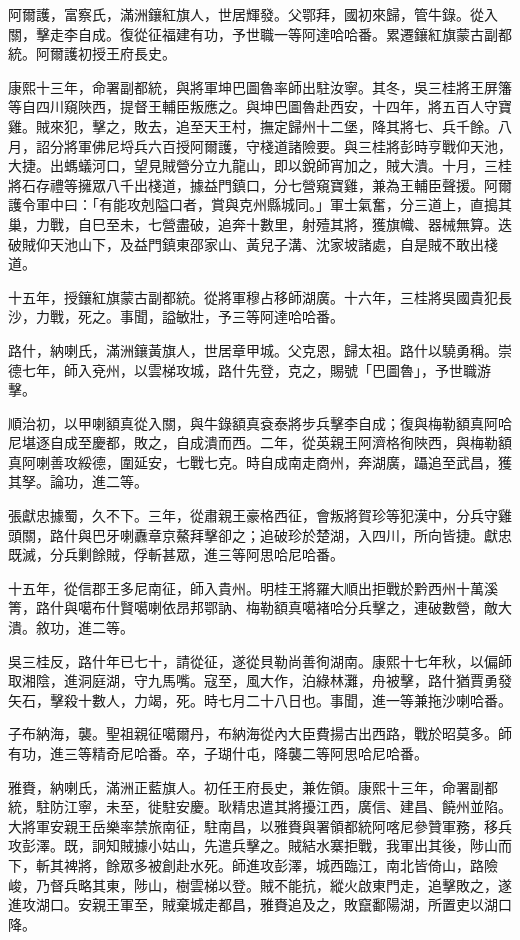 \begin{pinyinscope}
阿爾護，富察氏，滿洲鑲紅旗人，世居輝發。父鄂拜，國初來歸，管牛錄。從入關，擊走李自成。復從征福建有功，予世職一等阿達哈哈番。累遷鑲紅旗蒙古副都統。阿爾護初授王府長史。

康熙十三年，命署副都統，與將軍坤巴圖魯率師出駐汝寧。其冬，吳三桂將王屏籓等自四川窺陜西，提督王輔臣叛應之。與坤巴圖魯赴西安，十四年，將五百人守寶雞。賊來犯，擊之，敗去，追至天王村，撫定歸州十二堡，降其將七、兵千餘。八月，詔分將軍佛尼埒兵六百授阿爾護，守棧道諸險要。與三桂將彭時亨戰仰天池，大捷。出螞蟻河口，望見賊營分立九龍山，即以銳師宵加之，賊大潰。十月，三桂將石存禮等擁眾八千出棧道，據益門鎮口，分七營窺寶雞，兼為王輔臣聲援。阿爾護令軍中曰：「有能攻剋隘口者，賞與克州縣城同。」軍士氣奮，分三道上，直搗其巢，力戰，自巳至未，七營盡破，追奔十數里，射殪其將，獲旗幟、器械無算。迭破賊仰天池山下，及益門鎮東邵家山、黃兒子溝、沈家坡諸處，自是賊不敢出棧道。

十五年，授鑲紅旗蒙古副都統。從將軍穆占移師湖廣。十六年，三桂將吳國貴犯長沙，力戰，死之。事聞，謚敏壯，予三等阿達哈哈番。

路什，納喇氏，滿洲鑲黃旗人，世居章甲城。父克恩，歸太祖。路什以驍勇稱。崇德七年，師入兗州，以雲梯攻城，路什先登，克之，賜號「巴圖魯」，予世職游擊。

順治初，以甲喇額真從入關，與牛錄額真袞泰將步兵擊李自成；復與梅勒額真阿哈尼堪逐自成至慶都，敗之，自成潰而西。二年，從英親王阿濟格徇陜西，與梅勒額真阿喇善攻綏德，圍延安，七戰七克。時自成南走商州，奔湖廣，躡追至武昌，獲其孥。論功，進二等。

張獻忠據蜀，久不下。三年，從肅親王豪格西征，會叛將賀珍等犯漢中，分兵守雞頭關，路什與巴牙喇纛章京鰲拜擊卻之；追破珍於楚湖，入四川，所向皆捷。獻忠既滅，分兵剿餘賊，俘斬甚眾，進三等阿思哈尼哈番。

十五年，從信郡王多尼南征，師入貴州。明桂王將羅大順出拒戰於黔西州十萬溪箐，路什與噶布什賢噶喇依昂邦鄂訥、梅勒額真噶褚哈分兵擊之，連破數營，敵大潰。敘功，進二等。

吳三桂反，路什年已七十，請從征，遂從貝勒尚善徇湖南。康熙十七年秋，以偏師取湘陰，進洞庭湖，守九馬嘴。寇至，風大作，泊綠林灘，舟被擊，路什猶賈勇發矢石，擊殺十數人，力竭，死。時七月二十八日也。事聞，進一等兼拖沙喇哈番。

子布納海，襲。聖祖親征噶爾丹，布納海從內大臣費揚古出西路，戰於昭莫多。師有功，進三等精奇尼哈番。卒，子瑚什屯，降襲二等阿思哈尼哈番。

雅賚，納喇氏，滿洲正藍旗人。初任王府長史，兼佐領。康熙十三年，命署副都統，駐防江寧，未至，徙駐安慶。耿精忠遣其將擾江西，廣信、建昌、饒州並陷。大將軍安親王岳樂率禁旅南征，駐南昌，以雅賚與署領都統阿喀尼參贊軍務，移兵攻彭澤。既，詗知賊據小姑山，先遣兵擊之。賊結水寨拒戰，我軍出其後，陟山而下，斬其裨將，餘眾多被創赴水死。師進攻彭澤，城西臨江，南北皆倚山，路險峻，乃督兵略其東，陟山，樹雲梯以登。賊不能抗，縱火啟東門走，追擊敗之，遂進攻湖口。安親王軍至，賊棄城走都昌，雅賚追及之，敗竄鄱陽湖，所置吏以湖口降。


\end{pinyinscope}
